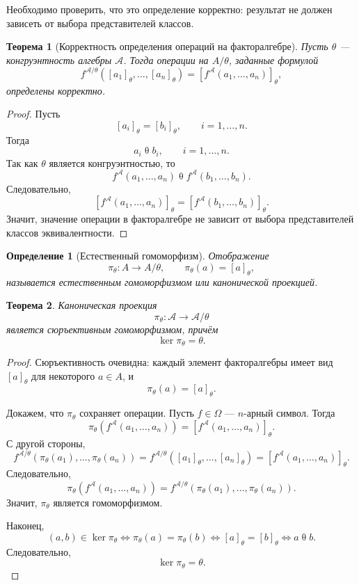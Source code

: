\documentclass[12pt,a4paper]{article}
\newtheorem{definition}{Определение}
\newtheorem{theorem}{Теорема}
\begin{document}
Необходимо проверить, что это определение корректно: результат не должен зависеть от выбора представителей классов.

\begin{theorem}[Корректность определения операций на факторалгебре]
Пусть $\theta$ --- конгруэнтность алгебры $\mathcal A$. Тогда операции на $A/\theta$, заданные формулой
\[
f^{\mathcal A/\theta}([a_1]_\theta,\dots,[a_n]_\theta)
=
[f^{\mathcal A}(a_1,\dots,a_n)]_\theta,
\]
определены корректно.
\end{theorem}

\begin{proof}
Пусть
\[
[a_i]_\theta=[b_i]_\theta,
\qquad i=1,\dots,n.
\]
Тогда
\[
a_i\mathrel{\theta}b_i,
\qquad i=1,\dots,n.
\]
Так как $\theta$ является конгруэнтностью, то
\[
f^{\mathcal A}(a_1,\dots,a_n)
\mathrel{\theta}
f^{\mathcal A}(b_1,\dots,b_n).
\]
Следовательно,
\[
[f^{\mathcal A}(a_1,\dots,a_n)]_\theta
=
[f^{\mathcal A}(b_1,\dots,b_n)]_\theta.
\]
Значит, значение операции в факторалгебре не зависит от выбора представителей классов эквивалентности.
\end{proof}

\begin{definition}[Естественный гомоморфизм]
Отображение
\[
\pi_\theta\colon A\to A/\theta,
\qquad
\pi_\theta(a)=[a]_\theta,
\]
называется \emph{естественным гомоморфизмом} или \emph{канонической проекцией}.
\end{definition}

\begin{theorem}
Каноническая проекция
\[
\pi_\theta\colon \mathcal A\to \mathcal A/\theta
\]
является сюръективным гомоморфизмом, причём
\[
\ker\pi_\theta=\theta.
\]
\end{theorem}

\begin{proof}
Сюръективность очевидна: каждый элемент факторалгебры имеет вид $[a]_\theta$ для некоторого $a\in A$, и
\[
\pi_\theta(a)=[a]_\theta.
\]

Докажем, что $\pi_\theta$ сохраняет операции. Пусть $f\in\Omega$ --- $n$-арный символ. Тогда
\[
\pi_\theta(f^{\mathcal A}(a_1,\dots,a_n))
=
[f^{\mathcal A}(a_1,\dots,a_n)]_\theta.
\]
С другой стороны,
\[
f^{\mathcal A/\theta}(\pi_\theta(a_1),\dots,\pi_\theta(a_n))
=
f^{\mathcal A/\theta}([a_1]_\theta,\dots,[a_n]_\theta)
=
[f^{\mathcal A}(a_1,\dots,a_n)]_\theta.
\]
Следовательно,
\[
\pi_\theta(f^{\mathcal A}(a_1,\dots,a_n))
=
f^{\mathcal A/\theta}(\pi_\theta(a_1),\dots,\pi_\theta(a_n)).
\]
Значит, $\pi_\theta$ является гомоморфизмом.

Наконец,
\[
(a,b)\in\ker\pi_\theta
\Longleftrightarrow
\pi_\theta(a)=\pi_\theta(b)
\Longleftrightarrow
[a]_\theta=[b]_\theta
\Longleftrightarrow
a\mathrel{\theta}b.
\]
Следовательно,
\[
\ker\pi_\theta=\theta.
\]
\end{proof}
\end{document}
